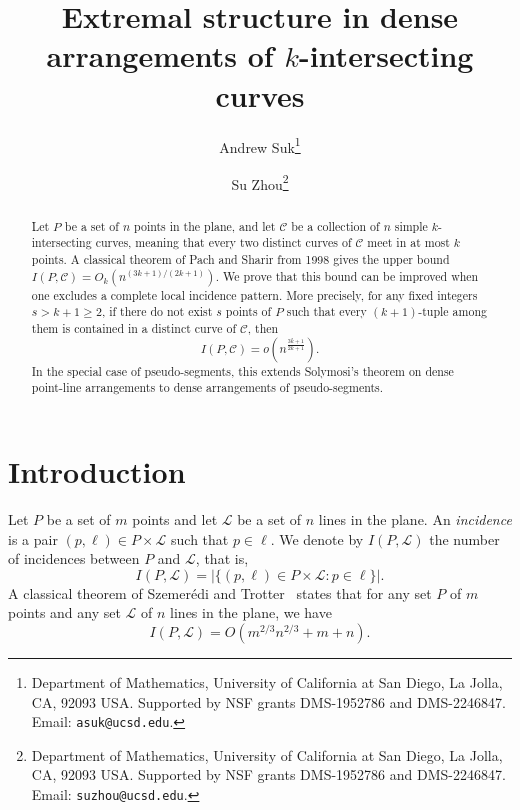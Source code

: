 \documentclass[11pt]{article}
\date{}
\title{Extremal structure in dense arrangements of $k$-intersecting curves}
\theoremstyle{plain}
\theoremstyle{definition}
\theoremstyle{remark}
\begin{document}
\author{Andrew Suk\thanks{Department of Mathematics, University of California at San Diego, La Jolla, CA, 92093 USA. Supported by NSF grants DMS-1952786 and DMS-2246847. Email: {\tt asuk@ucsd.edu}.}  \and Su Zhou\thanks{Department of Mathematics, University of California at San Diego, La Jolla, CA, 92093 USA. Supported by NSF grants DMS-1952786 and DMS-2246847. Email: {\tt suzhou@ucsd.edu}.} }


\maketitle










\begin{abstract}
Let $P$ be a set of $n$ points in the plane, and let $\mathcal C$ be a collection of $n$ simple $k$-intersecting curves, meaning that every two distinct curves of $\mathcal C$ meet in at most $k$ points. A classical theorem of Pach and Sharir from 1998 gives the upper bound $I(P,\mathcal C)=O_k(n^{(3k+1)/(2k+1)})$.  We prove that this bound can be improved when one excludes a complete
local incidence pattern. More precisely, for any fixed integers $s>k+1\ge2$, if there do not exist $s$ points of $P$ such that every $(k+1)$-tuple among them is contained in a distinct curve of $\mathcal C$, then
\[
I(P,\mathcal C)=o\!\left(n^{\frac{3k+1}{2k+1}}\right).
\]
In the special case of pseudo-segments, this extends Solymosi’s theorem on dense point-line arrangements to dense arrangements of pseudo-segments.
\end{abstract}









\section{Introduction}
Let $P$ be a set of $m$ points and let $\mathcal{L}$ be a set of $n$ lines in the plane. 
An \emph{incidence} is a pair $(p,\ell)\in P\times \mathcal{L}$ such that $p\in \ell$.  
We denote by $I(P,\mathcal{L})$ the number of incidences between $P$ and $\mathcal{L}$, that is,
\[
I(P,\mathcal{L})
=
\bigl|\{(p,\ell)\in P\times \mathcal{L} : p \in \ell\}\bigr|.
\]
A classical theorem of Szemer\'edi and Trotter~\cite{ST} states that for any set $P$ of $m$ points and any set $\mathcal{L}$ of $n$ lines in the plane, we have
\begin{equation}\label{IPL}
    I(P,\mathcal{L}) = O\!\left(m^{2/3}n^{2/3} + m + n\right).
\end{equation}
\end{document}
